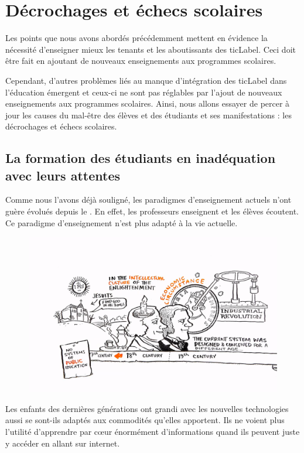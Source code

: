 \chapter{Décrochages et échecs scolaires}
Les points que nous avons abordés précédemment mettent en évidence la nécessité d'enseigner mieux les tenants et les aboutissants des \gls{ticLabel}. Ceci doit être fait en ajoutant de nouveaux enseignements aux programmes scolaires.

Cependant, d'autres problèmes liés au manque d'intégration des \gls{ticLabel} dans l'éducation émergent et ceux-ci ne sont pas réglables par l'ajout de nouveaux enseignements aux programmes scolaires. Ainsi, nous allons essayer de percer à jour les causes du mal-être des élèves et des étudiants et ses manifestations : les décrochages et échecs scolaires.

\section{La formation des étudiants en inadéquation avec leurs attentes}
Comme nous l'avons déjà souligné, les paradigmes d'enseignement actuels n'ont guère évolués depuis le  \cite{robinson2010paradigms}. En effet, les professeurs enseignent et les élèves écoutent. Ce paradigme d'enseignement n'est plus adapté à la vie actuelle.

\begin{figure}[h]
\centering
\includegraphics[trim=2cm 1.5cm 0cm 1.5cm, clip=true,
  width=\linewidth]{../resources/illustrations/public_education}
\end{figure}

Les enfants des dernières générations ont grandi avec les nouvelles technologies aussi se sont-ils adaptés aux commodités qu'elles apportent. Ils ne voient plus l'utilité d'apprendre par cœur énormément d'informations quand ils peuvent juste y accéder en allant sur internet.

